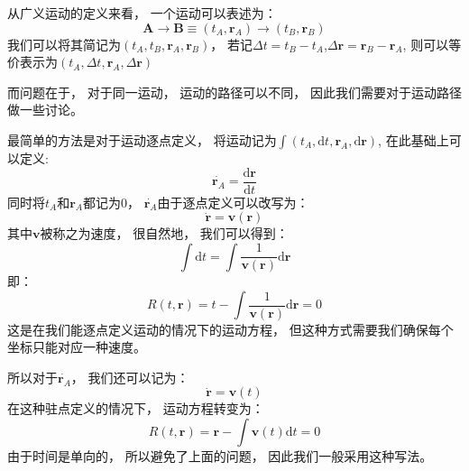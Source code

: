 \documentclass[UTF8,12pt]{ctexart}
\begin{document}
            从广义运动的定义来看，
            一个运动可以表述为：
            \begin{equation}
                \textbf{A}\rightarrow \textbf{B}\equiv (t_A,\textbf{r}_A)\rightarrow(t_B,\textbf{r}_B)
            \end{equation}
            我们可以将其简记为$(t_A,t_B,\textbf{r}_A,\textbf{r}_B)$，
            若记$\Delta t=t_B-t_A$,$\Delta \textbf{r}=\textbf{r}_B-\textbf{r}_A$,
            则可以等价表示为$(t_A,\Delta t,\textbf{r}_A,\Delta \textbf{r})$

            而问题在于，
            对于同一运动，
            运动的路径可以不同，
            因此我们需要对于运动路径做一些讨论。

            最简单的方法是对于运动逐点定义，
            将运动记为$\int(t_A,\mathrm{d}t,\textbf{r}_A,\mathrm{d}\textbf{r})$,
            在此基础上可以定义:
            \begin{equation}
                \dot{\textbf{r}_A}=\frac{\mathrm{d}\textbf{r}}{\mathrm{d}t}
            \end{equation}
            同时将$t_A$和$\textbf{r}_A$都记为0，
            $\dot{\textbf{r}_A}$由于逐点定义可以改写为：
            \begin{equation}
                \dot{\textbf{r}}=\textbf{v}(\textbf{r})
            \end{equation}
            其中$\textbf{v}$被称之为速度，
            很自然地，
            我们可以得到：
            \begin{equation}
                \int\mathrm{d} t=\int \frac{1}{\textbf{v}(\textbf{r})}\mathrm{d}\textbf{r}
            \end{equation}
            即：
            \begin{equation}
                R(t,\textbf{r})=t-\int \frac{1}{\textbf{v}(\textbf{r})}\mathrm{d}\textbf{r}=0
            \end{equation}
            这是在我们能逐点定义运动的情况下的运动方程，
            但这种方式需要我们确保每个坐标只能对应一种速度。

            所以对于$\dot{\textbf{r}_A}$，
            我们还可以记为：
            \begin{equation}
                \dot{\textbf{r}}=\textbf{v}(t)
            \end{equation}
            在这种驻点定义的情况下，
            运动方程转变为：
            \begin{equation}
                R(t,\textbf{r})=\textbf{r}-\int \textbf{v}(t)\mathrm{d}t=0
            \end{equation}
            由于时间是单向的，
            所以避免了上面的问题，
            因此我们一般采用这种写法。
\end{document}
